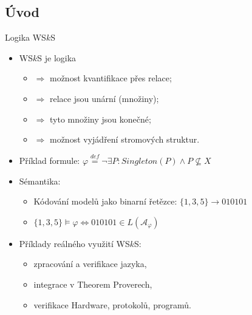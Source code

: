 \documentclass{beamer}
\begin{document}
	\subsection{Úvod}
	\begin{frame}{Logika WS$k$S}
	     \begin{itemize}
       \item WS$k$S je logika
       \begin{itemize}
         \pause
         \item {\color{blue}{druhého řádu}} $\Rightarrow$ možnost kvantifikace
         přes relace;
         \pause
         \item {\color{blue}{monadická}} $\Rightarrow$ relace jsou unární (množiny);
         \pause
         \item {\color{blue}{slabá}} $\Rightarrow$ tyto množiny jsou konečné;
         \pause
         \item {\color{blue}{s $k$ následníky}} $\Rightarrow$ možnost vyjádření
         stromových struktur.
         \pause
       \end{itemize}
              \item Příklad formule: $\varphi \overset{\mathit{def}}{=}
    \neg\exists P:
    Singleton(P) \wedge P
    \not\subseteq X$
       \pause
       \item Sémantika:
        \begin{itemize}
          \item Kódování modelů jako binarní řetězce: $\{1, 3, 5\} \rightarrow 010101$
					\item $\{1, 3, 5\} \models \varphi \Leftrightarrow 010101 \in L(\mathcal{A}_\varphi)$
        \end{itemize}
        \pause
				\smallskip
       \item Příklady reálného využití WS$k$S:
       \begin{itemize}
         \item zpracování a verifikace jazyka,
         \item integrace v Theorem Proverech,
         \item verifikace Hardware, protokolů, programů.
       \end{itemize}
     \end{itemize}
	\end{frame}
	
\end{document}
